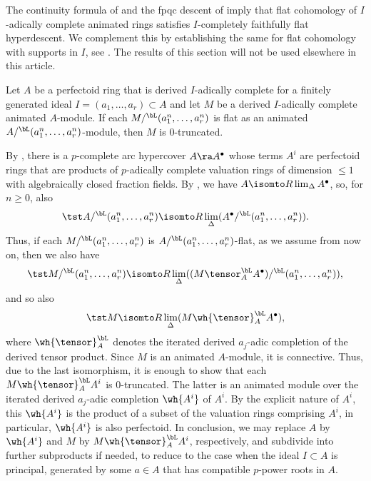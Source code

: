  \label{sec:genl-continuity}



The continuity formula of  and the fpqc descent of  imply that flat cohomology of $I$-adically complete animated rings satisfies $I$-completely faithfully flat hyperdescent. We complement this by establishing the same for flat cohomology with supports in $I$, see . The results of this section will not be used elsewhere in this article.



\blem \label{lem:M-discrete}
Let $A$ be a perfectoid ring that is derived $I$-adically complete for a finitely generated ideal $I = (a_1, \dotsc, a_r) \subset A$ and let $M$ be a derived $I$-adically complete animated $A$-module. If each $M/^\bL(a_1^n, \dotsc, a^n_r)$ is flat as an animated $A/^\bL(a_1^n, \dotsc, a_r^n)$-module, then $M$ is $0$-truncated.
\elem

\bpf
By , there is a $p$-complete arc hypercover $A \ra A^\bullet$ whose terms $A^i$ are perfectoid rings that are products of $p$-adically complete valuation rings of dimension $\le 1$ with algebraically closed fraction fields. By , we have $A \isomto R\lim_\Delta A^\bullet$, so, for $n \ge 0$, also
\[
\tst A/^\bL(a_1^n, \dotsc, a^n_r) \isomto R\lim_\Delta (A^\bullet/^\bL(a_1^n, \dotsc, a^n_r)).
\]
Thus, if each $M/^\bL(a_1^n, \dotsc, a^n_r)$ is $A/^\bL(a_1^n, \dotsc, a_r^n)$-flat, as we assume from now on, then we also have
\[
\tst M/^\bL(a_1^n, \dotsc, a^n_r) \isomto R\lim_\Delta ((M \tensor_A^\bL A^\bullet)/^\bL(a_1^n, \dotsc, a^n_r)),
\]
and so also
\[
\tst M \isomto R\lim_\Delta (M \wh{\tensor}_A^\bL A^\bullet),
\]
where $\wh{\tensor}_A^\bL$ denotes the iterated derived $a_j$-adic completion of the derived tensor product. Since $M$ is an animated $A$-module, it is connective. Thus, due to the last isomorphism, it is enough to show that each $M \wh{\tensor}_A^\bL A^i$ is $0$-truncated. The latter is an animated module over the iterated derived $a_j$-adic completion $\wh{A^i}$ of $A^i$. By the explicit nature of $A^i$, this $\wh{A^i}$ is the product of a subset of the valuation rings comprising $A^i$, in particular, $\wh{A^i}$ is also perfectoid. In conclusion, we may replace $A$ by $\wh{A^i}$ and $M$ by $M \wh{\tensor}_A^\bL A^i$, respectively, and subdivide into further subproducts if needed, to reduce to the case when the ideal $I \subset A$ is principal, generated by some $a \in A$ that has compatible $p$-power roots in $A$.


